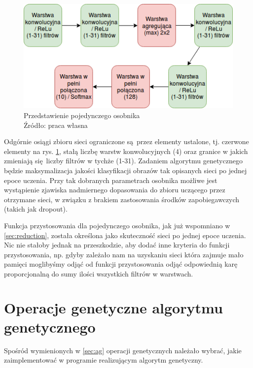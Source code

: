 \begin{figure}[h!tb]
	 \centering
	 \includegraphics[width = 1.0\linewidth]{img/fenotyp}
	 \caption{Przedstawienie pojedynczego osobnika \\
              Źródło: praca własna}
	 \label{fig:fenotyp}
\end{figure}

Odgórnie osiągi zbioru sieci ograniczone są przez elementy ustalone, tj. czerwone elementy na rys. \ref{fig:fenotyp}, stałą liczbę warstw konwolucyjnych (4) oraz granice w jakich zmieniają się liczby filtrów w tychże (1-31).
Zadaniem algorytmu genetycznego będzie maksymalizacja jakości klasyfikacji obrazów tak opisanych sieci po jednej epoce uczenia.
Przy tak dobranych parametrach osobnika możliwe jest wystąpienie zjawiska nadmiernego dopasowania do zbioru uczącego przez otrzymane sieci, w związku z brakiem zastosowania środków zapobiegawczych (takich jak dropout).

Funkcja przystosowania dla pojedynczego osobnika, jak już wspomniano w \ref{sec:reduction}, została określona jako skuteczność sieci po jednej epoce uczenia.
Nic nie stałoby jednak na przeszkodzie, aby dodać inne kryteria do funkcji przystosowania, np. gdyby zależało nam na uzyskaniu sieci która zajmuje mało pamięci moglibyśmy odjąć od funkcji przystosowania odjąć odpowiednią karę proporcjonalną do sumy ilości wszystkich filtrów w warstwach.

\section{Operacje genetyczne algorytmu genetycznego}\label{sec:genetic_ops}
Spośród wymienionych w \ref{sec:ag} operacji genetycznych należało wybrać, jakie zaimplementować w programie realizującym algorytm genetyczny.
